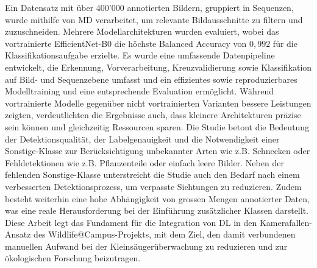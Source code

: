 Ein Datensatz mit über 400'000 annotierten Bildern, gruppiert in Sequenzen, wurde mithilfe von \ac{MD} verarbeitet, um relevante Bildausschnitte zu filtern und zuzuschneiden.
Mehrere Modellarchitekturen wurden evaluiert, wobei das vortrainierte EfficientNet-B0 die höchste Balanced Accuracy von \(0{,}992\) für die Klassifikationsaufgabe erzielte.
Es wurde eine umfassende Datenpipeline entwickelt, die Erkennung, Vorverarbeitung, Kreuzvalidierung sowie Klassifikation auf Bild- und Sequenzebene umfasst und ein effizientes sowie reproduzierbares Modelltraining und eine entsprechende Evaluation ermöglicht.
Während vortrainierte Modelle gegenüber nicht vortrainierten Varianten bessere Leistungen zeigten, verdeutlichten die Ergebnisse auch, dass kleinere Architekturen präzise sein können und gleichzeitig Ressourcen sparen.
Die Studie betont die Bedeutung der Detektionsqualität, der Labelgenauigkeit und die Notwendigkeit einer Sonstige-Klasse zur Berücksichtigung unbekannter Arten wie z.B. Schnecken oder Fehldetektionen wie z.B. Pflanzenteile oder einfach leere Bilder.
Neben der fehlenden Sonstige-Klasse unterstreicht die Studie auch den Bedarf nach einem verbesserten Detektionsprozess, um verpasste Sichtungen zu reduzieren.
Zudem besteht weiterhin eine hohe Abhängigkeit von grossen Mengen annotierter Daten, was eine reale Herausforderung bei der Einführung zusätzlicher Klassen darstellt.
Diese Arbeit legt das Fundament für die Integration von \ac{DL} in den Kamerafallen-Ansatz des Wildlife@Campus-Projekts, mit dem Ziel, den damit verbundenen manuellen Aufwand bei der Kleinsäugerüberwachung zu reduzieren und zur ökologischen Forschung beizutragen.
\vspace*{\fill}